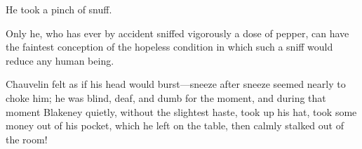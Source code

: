 He took a pinch of snuff.

Only he, who has ever by accident sniffed vigorously a dose of pepper, can have the faintest conception of the hopeless condition in which such a sniff would reduce any human being.

Chauvelin felt as if his head would burst—sneeze after sneeze seemed nearly to choke him; he was blind, deaf, and dumb for the moment, and during that moment Blakeney quietly, without the slightest haste, took up his hat, took some money out of his pocket, which he left on the table, then calmly stalked out of the room!